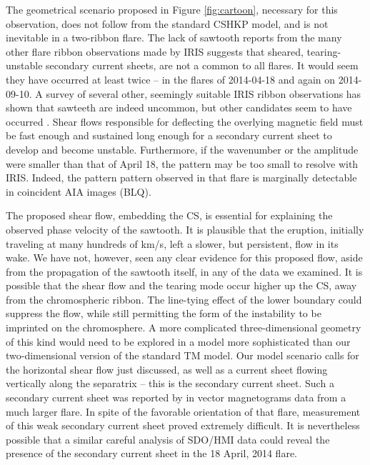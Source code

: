 The geometrical scenario proposed in Figure \ref{fig:cartoon}, necessary for this observation, does not follow from the standard CSHKP model, and is not inevitable in a two-ribbon flare.  The lack of sawtooth reports from the many other flare ribbon observations made by IRIS suggests that sheared, tearing-unstable secondary current sheets, are not a common to all flares.   It would seem they have occurred at least twice -- in the flares of 2014-04-18 and again on 2014-09-10.   A survey of several other, seemingly suitable IRIS ribbon observations has shown that sawteeth are indeed uncommon, but other candidates seem to have occurred \citep{Roegge2017}.  Shear flows responsible for deflecting the overlying magnetic field must be fast enough and sustained long enough for a secondary current sheet to develop and become unstable. Furthermore, if the wavenumber or the amplitude were smaller than that of April 18, the pattern may be too small to resolve with IRIS.  Indeed, the pattern pattern observed in that flare is marginally detectable in coincident AIA images (BLQ). 


The proposed shear flow, embedding the CS, is essential for explaining the observed phase velocity of the sawtooth.  It is plausible that the eruption, initially traveling at many hundreds of km/s, left a slower, but  persistent, flow in its wake.  We have not, however, seen any clear evidence for this proposed flow, aside from the propagation of the sawtooth itself, in any of the data we examined.  It is possible that the shear flow and the tearing mode occur higher up the CS, away from the chromospheric ribbon.  The line-tying effect of the lower boundary could suppress the flow, while still permitting the form of the instability to be imprinted on the chromosphere. A more complicated three-dimensional geometry of this kind would need to be explored in a model more sophisticated than our two-dimensional version of the standard TM model.  Our model scenario calls for the horizontal shear flow just discussed, as well as a current sheet flowing vertically along the separatrix -- this is the secondary current sheet.  Such a secondary current sheet was reported by \citep{Janvier2014} in vector magnetograms data from a much larger flare.  In spite of the favorable orientation of that flare, measurement of this weak secondary current sheet proved extremely difficult.  It is nevertheless possible that a similar careful analysis of SDO/HMI data could reveal the presence  of the secondary current sheet in the 18 April, 2014 flare.

